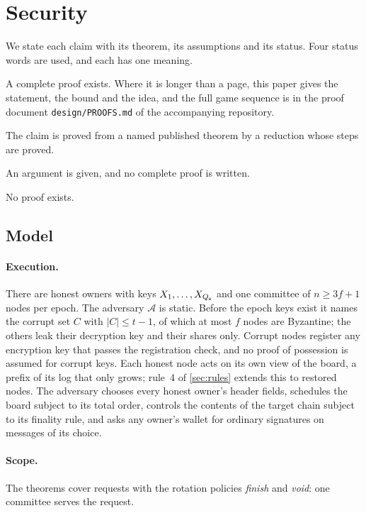 \section{Security}\label{sec:security}

We state each claim with its theorem, its assumptions and its status. Four status words are used, and each has one meaning.

\begin{description}[leftmargin=1.5em,itemsep=1pt]
\item[Proved.] A complete proof exists. Where it is longer than a page, this paper gives the statement, the bound and the idea, and the full game sequence is in the proof document \texttt{design/PROOFS.md} of the accompanying repository.
\item[Reduced.] The claim is proved from a named published theorem by a reduction whose steps are proved.
\item[Sketched.] An argument is given, and no complete proof is written.
\item[Open.] No proof exists.
\end{description}

\subsection{Model}\label{sec:model}

\paragraph{Execution.} There are honest owners with keys $X_1, \dots, X_{Q_{\mathsf{o}}}$ and one committee of $n \ge 3f+1$ nodes per epoch. The adversary $\mathcal{A}$ is static. Before the epoch keys exist it names the corrupt set $C$ with $|C| \le t-1$, of which at most $f$ nodes are Byzantine; the others leak their decryption key and their shares only. Corrupt nodes register any encryption key that passes the registration check, and no proof of possession is assumed for corrupt keys. Each honest node acts on its own view of the board, a prefix of its log that only grows; rule~4 of \cref{sec:rules} extends this to restored nodes. The adversary chooses every honest owner's header fields, schedules the board subject to its total order, controls the contents of the target chain subject to its finality rule, and asks any owner's wallet for ordinary signatures on messages of its choice.

\paragraph{Scope.} The theorems cover requests with the rotation policies \emph{finish} and \emph{void}: one committee serves the request.

